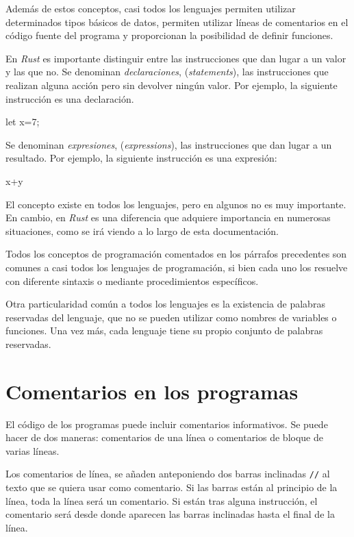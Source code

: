 Además de estos conceptos, casi todos los lenguajes permiten utilizar determinados tipos básicos de datos, permiten utilizar líneas de comentarios en el código fuente del programa y proporcionan la posibilidad de definir funciones.

En \textit{Rust} es importante distinguir entre las instrucciones que dan lugar a un valor y las que no. Se denominan \textit{declaraciones}, (\textit{statements}), las instrucciones que realizan alguna acción pero sin devolver ningún valor. Por ejemplo, la siguiente instrucción es una declaración.

\begin{Codigo}
   let x=7;
\end{Codigo}

Se denominan \textit{expresiones}, (\textit{expressions}), las instrucciones que dan lugar a un resultado. Por ejemplo, la siguiente instrucción es una expresión:

\begin{Codigo}
   x+y
\end{Codigo}

El concepto existe en todos los lenguajes, pero en algunos no es muy importante. En cambio, en \textit{Rust} es una diferencia que adquiere importancia en numerosas situaciones, como se irá viendo a lo largo de esta documentación.

Todos los conceptos de programación comentados en los párrafos precedentes son comunes a casi todos los lenguajes de programación, si bien cada uno los resuelve con diferente sintaxis o mediante procedimientos
específicos.

Otra particularidad común a todos los lenguajes es la existencia de palabras reservadas del lenguaje, que no se pueden utilizar como nombres de variables o funciones. Una vez más, cada lenguaje tiene su propio conjunto de palabras reservadas.

\section{Comentarios en los programas}
\label{sec_comentarios}
\noindent El código de los programas puede incluir comentarios informativos. Se puede hacer de dos maneras: comentarios de una línea o comentarios de bloque de varias líneas.

Los comentarios de línea, se añaden anteponiendo dos barras inclinadas \texttt{//} al texto que se quiera usar como comentario. Si las barras están al principio de la línea, toda la línea será un comentario. Si están tras alguna instrucción, el comentario será desde donde aparecen las barras inclinadas hasta el final de la línea.

